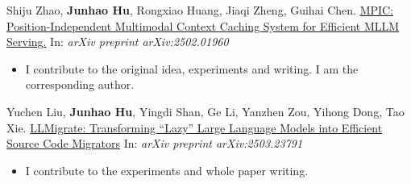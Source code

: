 \begin{enumerate}[label={[\arabic*]}]
    \item Shiju Zhao, \textbf{Junhao Hu}, Rongxiao Huang, Jiaqi Zheng, Guihai Chen. \href{https://arxiv.org/abs/2502.01960}{\color{cyan} MPIC: Position-Independent Multimodal Context Caching System for Efficient MLLM Serving.} In: \textit{arXiv preprint arXiv:2502.01960}
    \begin{itemize}
        \item I contribute to the original idea, experiments and writing. I am the corresponding author.
    \end{itemize}

    \item Yuchen Liu,  \textbf{Junhao Hu}, Yingdi Shan, Ge Li, Yanzhen Zou, Yihong Dong, Tao Xie. \href{https://arxiv.org/abs/2503.23791}{\color{cyan} LLMigrate: Transforming “Lazy” Large Language Models into Efficient Source Code Migrators} In: \textit{arXiv preprint arXiv:2503.23791}
    \begin{itemize}
        \item I contribute to the experiments and whole paper writing.
    \end{itemize}
\end{enumerate}